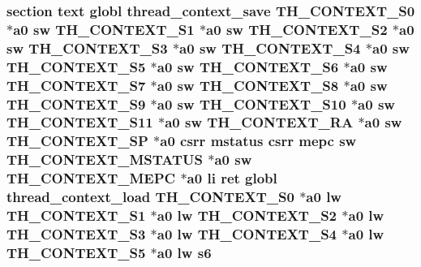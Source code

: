 \hypertarget{riscv_2kpanica_8S_a6950503db6ff4c0c89c0fcbe112aeccf}{
\subsubsection[{s6}]{\setlength{\rightskip}{0pt plus 5cm}section text globl {\bf thread\-\_\-context\-\_\-save} {\bf T\-H\-\_\-\-C\-O\-N\-T\-E\-X\-T\-\_\-\-S0} $\ast${\bf a0} {\bf sw} {\bf T\-H\-\_\-\-C\-O\-N\-T\-E\-X\-T\-\_\-\-S1} $\ast${\bf a0} {\bf sw} {\bf T\-H\-\_\-\-C\-O\-N\-T\-E\-X\-T\-\_\-\-S2} $\ast${\bf a0} {\bf sw} {\bf T\-H\-\_\-\-C\-O\-N\-T\-E\-X\-T\-\_\-\-S3} $\ast${\bf a0} {\bf sw} {\bf T\-H\-\_\-\-C\-O\-N\-T\-E\-X\-T\-\_\-\-S4} $\ast${\bf a0} {\bf sw} {\bf T\-H\-\_\-\-C\-O\-N\-T\-E\-X\-T\-\_\-\-S5} $\ast${\bf a0} {\bf sw} {\bf T\-H\-\_\-\-C\-O\-N\-T\-E\-X\-T\-\_\-\-S6} $\ast${\bf a0} {\bf sw} {\bf T\-H\-\_\-\-C\-O\-N\-T\-E\-X\-T\-\_\-\-S7} $\ast${\bf a0} {\bf sw} {\bf T\-H\-\_\-\-C\-O\-N\-T\-E\-X\-T\-\_\-\-S8} $\ast${\bf a0} {\bf sw} {\bf T\-H\-\_\-\-C\-O\-N\-T\-E\-X\-T\-\_\-\-S9} $\ast${\bf a0} {\bf sw} {\bf T\-H\-\_\-\-C\-O\-N\-T\-E\-X\-T\-\_\-\-S10} $\ast${\bf a0} {\bf sw} {\bf T\-H\-\_\-\-C\-O\-N\-T\-E\-X\-T\-\_\-\-S11} $\ast${\bf a0} {\bf sw} {\bf T\-H\-\_\-\-C\-O\-N\-T\-E\-X\-T\-\_\-\-R\-A} $\ast${\bf a0} {\bf sw} {\bf T\-H\-\_\-\-C\-O\-N\-T\-E\-X\-T\-\_\-\-S\-P} $\ast${\bf a0} csrr {\bf mstatus} csrr {\bf mepc} {\bf sw} {\bf T\-H\-\_\-\-C\-O\-N\-T\-E\-X\-T\-\_\-\-M\-S\-T\-A\-T\-U\-S} $\ast${\bf a0} {\bf sw} {\bf T\-H\-\_\-\-C\-O\-N\-T\-E\-X\-T\-\_\-\-M\-E\-P\-C} $\ast${\bf a0} {\bf li} ret globl {\bf thread\-\_\-context\-\_\-load} {\bf T\-H\-\_\-\-C\-O\-N\-T\-E\-X\-T\-\_\-\-S0} $\ast${\bf a0} {\bf lw} {\bf T\-H\-\_\-\-C\-O\-N\-T\-E\-X\-T\-\_\-\-S1} $\ast${\bf a0} {\bf lw} {\bf T\-H\-\_\-\-C\-O\-N\-T\-E\-X\-T\-\_\-\-S2} $\ast${\bf a0} {\bf lw} {\bf T\-H\-\_\-\-C\-O\-N\-T\-E\-X\-T\-\_\-\-S3} $\ast${\bf a0} {\bf lw} {\bf T\-H\-\_\-\-C\-O\-N\-T\-E\-X\-T\-\_\-\-S4} $\ast${\bf a0} {\bf lw} {\bf T\-H\-\_\-\-C\-O\-N\-T\-E\-X\-T\-\_\-\-S5} $\ast${\bf a0} {\bf lw} s6}}\label{riscv_2kpanica_8S_a6950503db6ff4c0c89c0fcbe112aeccf}
